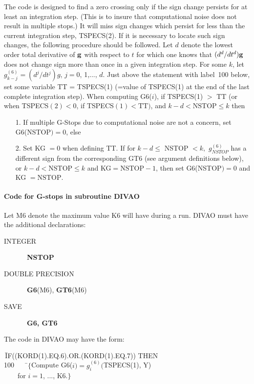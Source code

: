 \documentclass[twoside]{MATH77}
\begin{document}
The code is designed to find a zero crossing only if the sign change
persists for at least an integration step. (This is to insure that
computational noise does not result in multiple stops.) It will miss sign
changes which persist for less than the current integration step,
TSPECS(2). If it is necessary to locate such sign changes, the following
procedure should be followed. Let $d$ denote the lowest order total
derivative of ${\bf g}$ with respect to $t$ for which one knows that
$(d^d/dt^d){\bf g}$ does not change sign more than once in a given
integration step. For some $k$, let $g_{k-j}^{(6)}=(d^j/dt^j)g$, $j=0$,
1,..., $d$. Just above the statement with label~100 below, set some
variable TT = TSPECS(1) (=value of TSPECS(1) at the end of the last
complete integration step). When computing G6($i$), if TSPECS(1) $>$ TT (or
when TSPECS$(2)<0$, if TSPECS$(1)<\text{TT})$, and $k-d<\text{NSTOP} \leq
k$ then
\begin{itemize}
\item[1.] If multiple G-Stops due to computational noise are not a
concern, set G6(NSTOP$) = 0$, else

\item[2.] Set KG $=0$ when defining TT. If for $k-d\leq $ NSTOP $<k,$ $%
g_{NSTOP}^{(6)}$ has a different sign from the corresponding GT6 (see
argument definitions below), or $k-d<\text{NSTOP}\leq k$ and KG$=%
\text{NSTOP}-1$, then set G6(NSTOP$)=0$ and KG $=\text{NSTOP}.$
\end{itemize}

\paragraph{Code for G-stops in subroutine DIVAO}

Let M6 denote the maximum value K6 will have during a run. DIVAO must
have the additional declarations:

\begin{description}
\item[INTEGER] \ {\bf NSTOP}

\item[DOUBLE PRECISION]  \ {\bf G6}(M6), {\bf GT6}(M6)

\item[SAVE]  \ {\bf G6, GT6}
\end{description}

The code in DIVAO may have the form:
\begin{tabbing}
\phantom{100}\,\=IF((KORD(1).EQ.6).OR.(KORD(1).EQ.7)) THEN\\

100\>\ \ \ \ \=$\{$Compute G6($i) = g^{(6)}_i($TSPECS(1), Y)\\
\>\>\ \ \ \ for $i = 1$, ..., K6.$\}$
\end{tabbing}
\hspace{.31in}%
\end{document}
